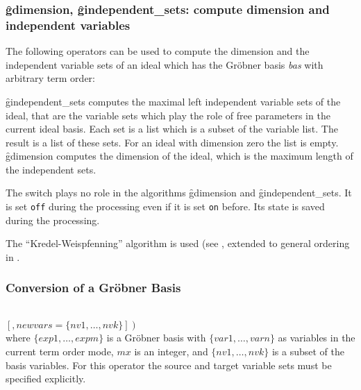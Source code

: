 \subsubsection{\f{gdimension}, \f{gindependent\_sets}: compute dimension and
independent variables}
The following operators can be used to compute the dimension
and the independent variable sets of an ideal which has the
Gr\"obner basis \textit{bas} with arbitrary term order:
\begin{description}
\item[\f{gdimension bas}]
  \hypertarget{operator:GDIMENSION}{}
\item[\f{gindependent\_sets bas}]
  \hypertarget{operator:GINDEPENDENT_SETS}{}
\f{gindependent\_sets} computes the maximal
left independent variable sets of the ideal, that are
the variable sets which play the role of free parameters in the
current ideal basis. Each set is a list which is a subset of the
variable list. The result is a list of these sets. For an
ideal with dimension zero the list is empty.
\f{gdimension} computes the dimension of the ideal,
which is the maximum length of the independent sets.
\end{description}

The switch  plays no role in the algorithms \f{gdimension} and
\f{gindependent\_sets}. It is set \texttt{off} during the processing even if
it is set \texttt{on} before. Its state is saved during the processing.

The ``Kredel-Weispfenning'' algorithm is used (see \cite{Kredel:88a},
extended to general ordering in \cite{Becker:93}.

\subsubsection{Conversion of a Gr\"obner Basis}

\begin{description}
\item[{\f{glexconvert}$\left(\{exp,\ldots , expm\} \left[,\{var1
        \ldots , varn\}\right]\left[,maxdeg=mx\right]\right.$}]\mbox{}\\
  \hypertarget{operator:GLEXCONVERT}{}
$\left.\left[,newvars=\{nv1, \ldots , nvk\}\right]\right)$ \\
where $\{exp1, \ldots , expm\}$ is a Gr\"obner basis with
$\{var1, \ldots , varn\}$ as variables in the current term order mode,
$mx$ is an integer, and
$\{nv1, \ldots , nvk\}$ is a subset of the basis variables.
For this operator the source and target variable sets must be specified
explicitly.
\end{description}

